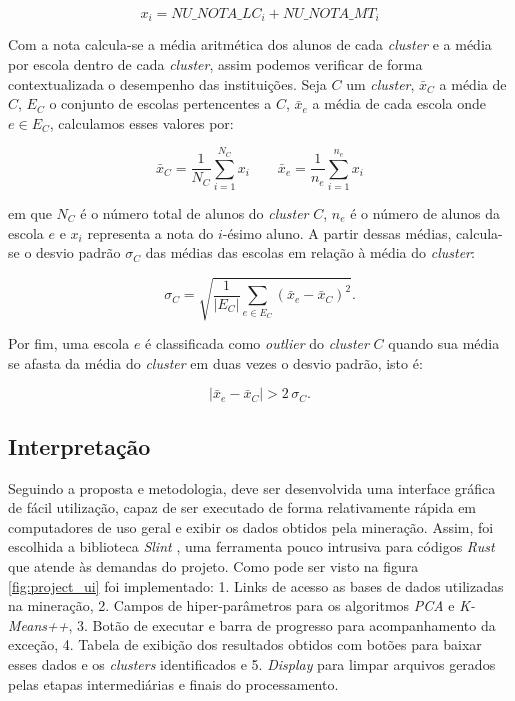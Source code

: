 \documentclass[12pt]{article}
\begin{document}
\begin{equation}
x_i = NU\_NOTA\_LC_i + NU\_NOTA\_MT_i
\end{equation}

Com a nota calcula-se a média aritmética dos alunos de cada \textit{cluster} e a média por escola dentro de cada \textit{cluster}, assim podemos verificar de forma contextualizada o desempenho das instituições. Seja $C$ um \textit{cluster}, $\bar{x}_C$ a média de $C$, $E_C$ o conjunto de escolas pertencentes a $C$, $\bar{x}_e$ a média de cada escola onde $e \in E_C$, calculamos esses valores por:

\begin{equation}
\bar{x}_C = \frac{1}{N_C}\sum_{i=1}^{N_C} x_i
\qquad
\bar{x}_e = \frac{1}{n_e}\sum_{i=1}^{n_e} x_i
\end{equation}

\noindent em que $N_C$ é o número total de alunos do \textit{cluster} $C$, $n_e$ é o número de alunos da escola $e$ e $x_i$ representa a nota do $i$-ésimo aluno. A partir dessas médias, calcula-se o desvio padrão $\sigma_C$ das médias das escolas em relação à média do \textit{cluster}:

\begin{equation}
\sigma_C = \sqrt{\frac{1}{|E_C|}\sum_{e \in E_C}\left(\bar{x}_e - \bar{x}_C\right)^2}.
\end{equation}

Por fim, uma escola $e$ é classificada como \textit{outlier} do \textit{cluster} $C$ quando sua média se afasta da média do \textit{cluster} em duas vezes o desvio padrão, isto é:

\begin{equation}
\left|\bar{x}_e - \bar{x}_C\right| > 2\,\sigma_C.
\end{equation}

\subsection{Interpretação}

Seguindo a proposta e metodologia, deve ser desenvolvida uma interface gráfica de fácil utilização, capaz de ser executado de forma relativamente rápida em computadores de uso geral e exibir os dados obtidos pela mineração. Assim, foi escolhida a biblioteca \textit{Slint} \cite{misc:slint_lib}, uma ferramenta pouco intrusiva para códigos \textit{Rust} que atende às demandas do projeto. Como pode ser visto na figura \ref{fig:project_ui} foi implementado: 1. Links de acesso as bases de dados utilizadas na mineração, 2. Campos de hiper-parâmetros para os algoritmos \textit{PCA} e \textit{K-Means++}, 3. Botão de executar e barra de progresso para acompanhamento da exceção, 4. Tabela de exibição dos resultados obtidos com botões para baixar esses dados e os \textit{clusters} identificados e 5. \textit{Display} para limpar arquivos gerados pelas etapas intermediárias e finais do processamento.
\end{document}
